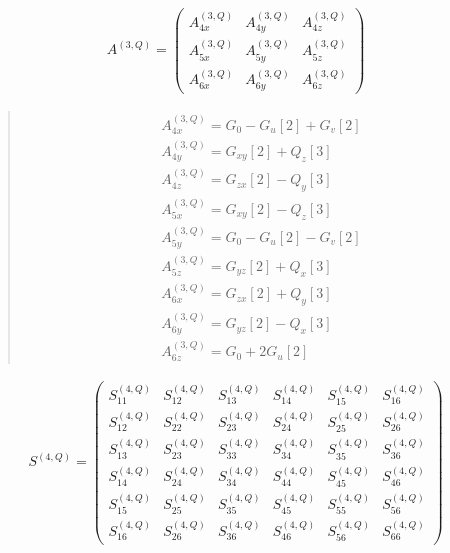 \documentclass[fleqn,10pt]{jsarticle}
\begin{document}
\begin{align*}
A^{(3,Q)} = \begin{pmatrix} A^{(3,Q)}_{4x} & A^{(3,Q)}_{4y} & A^{(3,Q)}_{4z} \\ A^{(3,Q)}_{5x} & A^{(3,Q)}_{5y} & A^{(3,Q)}_{5z} \\ A^{(3,Q)}_{6x} & A^{(3,Q)}_{6y} & A^{(3,Q)}_{6z} \end{pmatrix}
\end{align*}
\begin{quote}
\begin{align*}
& A^{(3,Q)}_{4x} = G_{0} - G_{u}[2] + G_{v}[2] \\
& A^{(3,Q)}_{4y} = G_{xy}[2] + Q_{z}[3] \\
& A^{(3,Q)}_{4z} = G_{zx}[2] - Q_{y}[3] \\
& A^{(3,Q)}_{5x} = G_{xy}[2] - Q_{z}[3] \\
& A^{(3,Q)}_{5y} = G_{0} - G_{u}[2] - G_{v}[2] \\
& A^{(3,Q)}_{5z} = G_{yz}[2] + Q_{x}[3] \\
& A^{(3,Q)}_{6x} = G_{zx}[2] + Q_{y}[3] \\
& A^{(3,Q)}_{6y} = G_{yz}[2] - Q_{x}[3] \\
& A^{(3,Q)}_{6z} = G_{0} + 2 G_{u}[2]
\end{align*}
\end{quote}
\begin{align*}
S^{(4,Q)} = \begin{pmatrix} S^{(4,Q)}_{11} & S^{(4,Q)}_{12} & S^{(4,Q)}_{13} & S^{(4,Q)}_{14} & S^{(4,Q)}_{15} & S^{(4,Q)}_{16} \\ S^{(4,Q)}_{12} & S^{(4,Q)}_{22} & S^{(4,Q)}_{23} & S^{(4,Q)}_{24} & S^{(4,Q)}_{25} & S^{(4,Q)}_{26} \\ S^{(4,Q)}_{13} & S^{(4,Q)}_{23} & S^{(4,Q)}_{33} & S^{(4,Q)}_{34} & S^{(4,Q)}_{35} & S^{(4,Q)}_{36} \\ S^{(4,Q)}_{14} & S^{(4,Q)}_{24} & S^{(4,Q)}_{34} & S^{(4,Q)}_{44} & S^{(4,Q)}_{45} & S^{(4,Q)}_{46} \\ S^{(4,Q)}_{15} & S^{(4,Q)}_{25} & S^{(4,Q)}_{35} & S^{(4,Q)}_{45} & S^{(4,Q)}_{55} & S^{(4,Q)}_{56} \\ S^{(4,Q)}_{16} & S^{(4,Q)}_{26} & S^{(4,Q)}_{36} & S^{(4,Q)}_{46} & S^{(4,Q)}_{56} & S^{(4,Q)}_{66} \end{pmatrix}
\end{align*}
\end{document}
